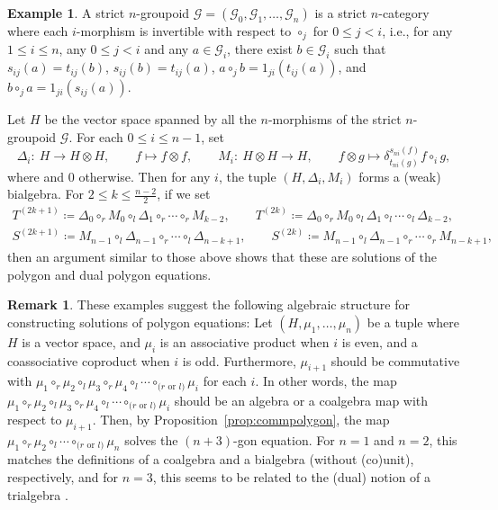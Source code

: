 \documentclass[10pt,a4paper]{amsart}
\numberwithin{equation}{section}
\theoremstyle{definition}
\newtheorem{Example}[Theorem]{Example}
\newtheorem{Remark}[Theorem]{Remark}
\begin{document}
\begin{Example}
 A strict $n$-groupoid $\mathcal{G}=(\mathcal{G}_0,\mathcal{G}_1,\dots,\mathcal{G}_n)$ is a strict $n$-category where each $i$-morphism is invertible with respect to $\circ_j$ for $0\leq j<i$, i.e., for any $1\leq i \leq n$, any $0\leq j <i$ and any $a\in \mathcal{G}_i$, there exist $b\in\mathcal{G}_i$ such that $s_{ij}(a)=t_{ij}(b)$, $s_{ij}(b)=t_{ij}(a)$, $a \circ_{j} b=1_{ji}(t_{ij}(a))$, and $b \circ_{j} a=1_{ji}(s_{ij}(a))$.

 Let $H$ be the vector space spanned by all the $n$-morphisms of the strict $n$-groupoid $\mathcal{G}$.
 For each $0 \leq i \leq n-1$, set
 \begin{equation*}
 \Delta_i \colon \ H \to H \otimes H,\qquad f\mapsto f \otimes f, \qquad M_i \colon \ H \otimes H \to H, \qquad f \otimes g\mapsto \delta^{s_{ni}(f)}_{t_{ni}(g)}f\circ_{i}g,
 \end{equation*}
 where  and $0$ otherwise.
 Then for any $i$, the tuple $(H, \Delta_i ,M_i)$
 forms a (weak) bialgebra.
 For $2\leq k \leq \frac{n-2}{2}$, if we set
 \begin{gather*}
 T^{(2k+1)} \coloneqq \Delta_0 \circ_r M_0 \circ_l \Delta_1 \circ_r \cdots \circ_{r} M_{k-2}, \qquad T^{(2k)} \coloneqq \Delta_0 \circ_r M_0 \circ_l \Delta_1 \circ_l \cdots \circ_{l} \Delta_{k-2},\\
 S^{(2k+1)} \coloneqq M_{n-1} \circ_l \Delta_{n-1} \circ_r \cdots \circ_l \Delta_{n-k+1}, \qquad S^{(2k)} \coloneqq M_{n-1} \circ_l \Delta_{n-1} \circ_r \cdots \circ_r M_{n-k+1},
 \end{gather*}
 then an argument similar to those above shows that these are solutions of the polygon and dual polygon equations.
\end{Example}

\begin{Remark}
 These examples suggest the following algebraic structure for constructing solutions of polygon equations: Let $(H, \mu_1, \dots ,\mu_n)$ be a tuple where $H$ is a vector space, and $\mu_i$ is an associative product when $i$ is even, and a coassociative coproduct when $i$ is odd.
 Furthermore, $\mu_{i+1}$ should be commutative with $\mu_1\circ_r\mu_2\circ_l\mu_3\circ_r\mu_4\circ_l\cdots\circ_{\text{($r$ or $l$)}}\mu_i$ for each $i$.
 In other words, the map $\mu_1\circ_r\mu_2\circ_l\mu_3\circ_r\mu_4\circ_l\cdots\circ_{\text{($r$ or $l$)}}\mu_i$ should be an algebra or a coalgebra map with respect to $\mu_{i+1}$. Then, by Proposition~\ref{prop:commpolygon}, the map $\mu_1\circ_r\mu_2\circ_l\cdots\circ_{\text{($r$ or $l$)}}\mu_n$ solves the $(n+3)$-gon equation.
 For $n=1$ and $n=2$, this matches the definitions of a coalgebra and a bialgebra (without (co)unit), respectively, and for $n=3$, this seems to be related to the (dual) notion of a trialgebra \cite{crane1994four, grosse2000trialgebraic, grosse2000second, pfeiffer20072}.
\end{Remark}
\end{document}
